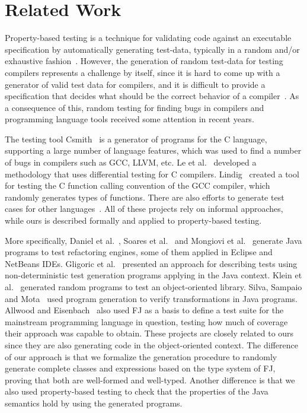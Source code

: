 \documentclass[tese,capa,english]{texufpel}
\begin{document}
\section{Related Work}

Property-based testing is a technique for validating code against an executable specification by automatically generating test-data, typically in a random and/or exhaustive fashion~\cite{blanco2017property}. However, the generation of random test-data for testing compilers represents a challenge by itself, since it is hard to come up with a generator of valid test data for compilers, and it is difficult to provide a specification that decides what should be the correct behavior of a compiler~\cite{Palka:2011:TOC:1982595.1982615}. As a consequence of this, random testing for finding bugs in compilers and programming language tools received some attention in recent years. 

The testing tool Csmith~\cite{Yang:2011:FUB:1993316.1993532} is a generator of programs for the C language, supporting a large number of language features, which was used to find a number of bugs in compilers such as GCC, LLVM, etc. Le et al.~\cite{Le:2014:CVV:2666356.2594334} developed a methodology that uses differential testing for C compilers. Lindig~\cite{Lindig:2005:RTC:1085130.1085132} created a tool for testing the C function calling convention of the GCC compiler, which randomly generates types of functions. There are also efforts to generate test cases for other languages~\cite{Drienyovszky:2010:QRT:1863509.1863521}. All of these projects rely on informal approaches, while ours is described formally and applied to property-based testing.

More specifically, Daniel et al.~\cite{Daniel:2007:ATR:1287624.1287651}, Soares et al.~\cite{soares2013automated} and Mongiovi et al.~\cite{mongiovi2014scaling} generate Java programs to test refactoring engines, some of them applied in Eclipse and NetBeans IDEs. Gligoric et al.~\cite{gligoric2010test} presented an approach for describing tests using non-deterministic test generation programs applying in the Java context. Klein et al.~\cite{Klein:2010:RTH:1869459.1869505} generated random programs to test an object-oriented library. Silva, Sampaio and Mota~\cite{da2015verifying} used program generation to verify transformations in Java programs. Allwood and Eisenbach~\cite{Allwood:2009:TJF:1628315.1628375} also used FJ as a basis to define a test suite for the mainstream programming language in question, testing how much of coverage their approach was capable to obtain. These projects are closely related to ours since they are also generating code in the object-oriented context. The difference of our approach is that we formalize the generation procedure to randomly generate complete classes and expressions based on the type system of FJ, proving that both are well-formed and well-typed. Another difference is that we also used property-based testing to check that the properties of the Java semantics hold by using the generated programs.
\end{document}
